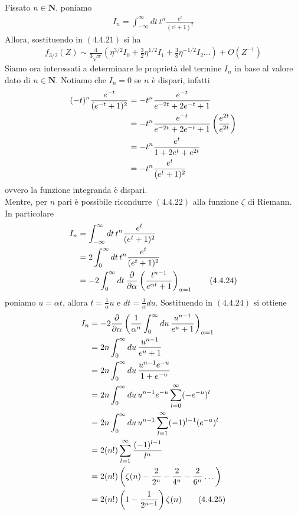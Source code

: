 \documentclass{article}
\begin{document}
Fissato $n \in \mathbf{N}$, poniamo
\begin{align}
    I_n = \int_{-\infty}^\infty dt \, t^n\frac{e^t}{(e^t + 1)^2} \tag{4.4.22}
\end{align}
Allora, sostituendo in $(4.4.21)$ si ha 
\begin{align}
    f_{3/2}(Z) \sim \frac{4}{3\sqrt{\pi}}\left(\eta^{3/2}I_0 + \frac{3}{2}\eta^{1/2}I_1 + \frac{3}{8}\eta^{-1/2}I_2 \dots\right) + O(Z^{-1}) \tag{4.4.23}
\end{align}
Siamo ora interessati a determinare le proprietà del termine $I_n$ in base al valore dato di $n \in \mathbf{N}$. Notiamo che $I_n = 0$ se $n$ è dispari, infatti
\begin{align}
    (-t)^n\frac{e^{-t}}{(e^{-t} + 1)^2} &= -t^n\frac{e^{-t}}{e^{-2t} + 2e^{-t} + 1} \notag \\
    &= -t^n\frac{e^{-t}}{e^{-2t} + 2e^{-t} + 1}\left(\frac{e^{2t}}{e^{2t}}\right) \notag \\
    &= -t^n\frac{e^t}{1 + 2e^t + e^{2t}} \notag \\
    &= -t^n\frac{e^t}{(e^t + 1)^2} \notag
\end{align}
ovvero la funzione integranda è dispari. \\
Mentre, per $n$ pari è possibile ricondurre $(4.4.22)$ alla funzione $\zeta$ di Riemann. In particolare
\begin{align}
    I_n &= \int_{-\infty}^\infty dt \, t^n\frac{e^t}{(e^t + 1)^2} \notag \\
    &= 2\int_0^\infty dt \, t^n\frac{e^t}{(e^t + 1)^2} \notag \\
    &= -2\int_0^\infty dt \, \frac{\partial}{\partial \alpha}\left(\frac{t^{n - 1}}{e^{\alpha t} + 1}\right)_{\alpha = 1} \tag{4.4.24}
\end{align}
poniamo $u = \alpha t$, allora $t = \frac{1}{\alpha}u$ e $dt = \frac{1}{\alpha}du$. Sostituendo in $(4.4.24)$ si ottiene
\begin{align}
    I_n &= -2\frac{\partial}{\partial \alpha}\left(\frac{1}{\alpha^n}\int_0^\infty du \, \frac{u^{n - 1}}{e^u + 1}\right)_{\alpha = 1} \notag \\
    &= 2n\int_0^\infty du \, \frac{u^{n - 1}}{e^u + 1} \notag \\
    &= 2n\int_0^\infty du \, \frac{u^{n - 1}e^{-u}}{1 + e^{-u}} \notag \\
    &= 2n\int_0^\infty du \, u^{n - 1}e^{-u}\sum_{l = 0}^\infty (-e^{-u})^l \notag \\
    &= 2n\int_0^\infty du \, u^{n - 1}\sum_{l = 1}^\infty (-1)^{l - 1}(e^{-u})^l \notag \\
    &= 2(n!)\sum_{l = 1}^\infty \frac{(-1)^{l - 1}}{l^n} \notag \\
    &= 2(n!)\left(\zeta(n) - \frac{2}{2^n} - \frac{2}{4^n} - \frac{2}{6^n} \dots\right) \notag \\
    &= 2(n!)\left(1 - \frac{1}{2^{n - 1}}\right)\zeta(n)  \tag{4.4.25}
\end{align}
\end{document}
